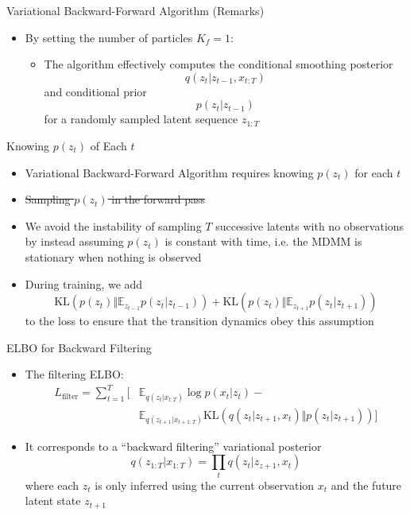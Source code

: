 \documentclass{beamer}
\begin{document}
\begin{frame}{Variational Backward-Forward Algorithm (Remarks)}
\begin{itemize}
\item By setting the number of particles $K_f=1$:
\begin{itemize}
\item The algorithm effectively computes the conditional smoothing posterior\[
q(z_t|z_{t-1},x_{t:T})
\]and conditional prior \[
p(z_t|z_{t-1})
\] for a randomly sampled latent sequence $z_{1:T}$
\end{itemize}
\end{itemize}
\end{frame}

\begin{frame}{Knowing $p(z_t)$ of Each $t$}
\begin{itemize}
\item Variational Backward-Forward Algorithm requires knowing $p(z_t)$ for each $t$
\item \sout{Sampling $p(z_t)$ in the forward pass}
\item We avoid the instability of sampling $T$ successive latents with no observations by instead assuming $p(z_t)$ is constant with time, i.e. the MDMM is stationary when nothing is observed
\item During training, we add\[
\text{KL}\left(p(z_t)\Vert\mathbb{E}_{z_{t-1}}p(z_t|z_{t-1})\right)+\text{KL}\left(p(z_t)\Vert\mathbb{E}_{z_{t+1}}p(z_t|z_{t+1})\right)
\]to the loss to ensure that the transition dynamics obey this assumption
\end{itemize}
\end{frame}

\begin{frame}{ELBO for Backward Filtering}
\begin{itemize}
\item The filtering ELBO:\[
\begin{split}
L_\text{filter}=\sum_{t=1}^T[&\mathbb{E}_{q(z_t|x_{t:T})}\log p(x_t|z_t)-\\
&\mathbb{E}_{q(z_{t+1}|x_{t+1:T})}\text{KL}(q(z_t|z_{t+1},x_t)\Vert p(z_t|z_{t+1}))]
\end{split}
\]
\item It corresponds to a ``backward filtering'' variational posterior\[
q(z_{1:T}|x_{1:T})=\prod_t q(z_t|z_{z+1},x_t)
\]where each $z_t$ is only inferred using the current observation $x_t$ and the future latent state $z_{t+1}$
\end{itemize}
\end{frame}
\end{document}
